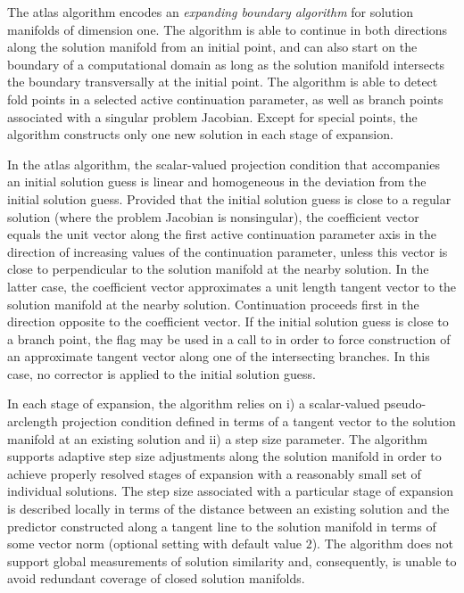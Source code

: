 The  atlas algorithm encodes an \emph{expanding boundary algorithm} for solution manifolds of dimension one. The algorithm is able to continue in both directions along the solution manifold from an initial point, and can also start on the boundary of a computational domain as long as the solution manifold intersects the boundary transversally at the initial point. The algorithm is able to detect fold points in a selected active continuation parameter, as well as branch points associated with a singular problem Jacobian. Except for special points, the algorithm constructs only one new solution in each stage of expansion.

In the  atlas algorithm, the scalar-valued projection condition that accompanies an initial solution guess is linear and homogeneous in the deviation from the initial solution guess. Provided that the initial solution guess is close to a regular solution (where the problem Jacobian is nonsingular), the coefficient vector equals the unit vector along the first active continuation parameter axis in the direction of increasing values of the continuation parameter, unless this vector is close to perpendicular to the solution manifold at the nearby solution. In the latter case, the coefficient vector approximates a unit length tangent vector to the solution manifold at the nearby solution. Continuation proceeds first in the direction opposite to the coefficient vector. If the initial solution guess is close to a branch point, the  flag may be used in a call to  in order to force construction of an approximate tangent vector along one of the intersecting branches. In this case, no corrector is applied to the initial solution guess.

In each stage of expansion, the  algorithm relies on i) a scalar-valued pseudo-arclength projection condition defined in terms of a tangent vector to the solution manifold at an existing solution and ii) a step size parameter. The algorithm supports adaptive step size adjustments along the solution manifold in order to achieve properly resolved stages of expansion with a reasonably small set of individual solutions. The step size associated with a particular stage of expansion is described locally in terms of the distance between an existing solution and the predictor constructed along a tangent line to the solution manifold in terms of some vector norm (optional setting  with default value $2$). The algorithm does not support global measurements of solution similarity and, consequently, is unable to avoid redundant coverage of closed solution manifolds.

